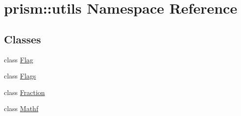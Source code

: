 \hypertarget{namespaceprism_1_1utils}{}\section{prism\+:\+:utils Namespace Reference}
\label{namespaceprism_1_1utils}
\subsection*{Classes}
\begin{DoxyCompactItemize}
\item 
class \hyperlink{classprism_1_1utils_1_1_flag}{Flag}
\item 
class \hyperlink{classprism_1_1utils_1_1_flags}{Flags}
\item 
class \hyperlink{classprism_1_1utils_1_1_fraction}{Fraction}
\item 
class \hyperlink{classprism_1_1utils_1_1_mathf}{Mathf}
\end{DoxyCompactItemize}
